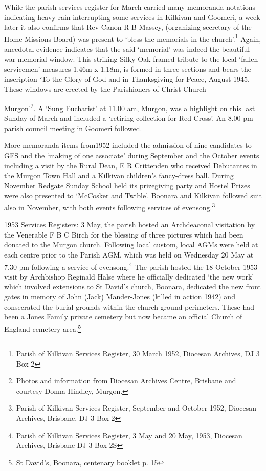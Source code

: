 While the parish services register for March carried many memoranda notations indicating heavy rain interrupting some services in Kilkivan and Goomeri, a week later it also confirms that Rev Canon R B Massey, (organizing secretary of the Home Missions Board) was present to `bless the memorials in the church'.\footnote{Parish of Kilkivan Services Register, 30 March 1952, Diocesan Archives, DJ 3 Box 2} Again, anecdotal evidence indicates that the said `memorial' was indeed the beautiful war memorial window. This striking Silky Oak framed tribute to the local `fallen servicemen' measures 1.46m x 1.18m, is formed in three sections and bears the inscription `To the Glory of God and in Thanksgiving for Peace, August 1945. These windows are erected by the Parishioners of Christ Church

Murgon'\footnote{Photos and information from Diocesan Archives Centre, Brisbane and courtesy Donna Hindley, Murgon.}. A `Sung Eucharist' at 11.00 am, Murgon, was a highlight on this last Sunday of March and included a `retiring collection for Red Cross'. An 8.00 pm parish council meeting in Goomeri followed.

More memoranda items from1952 included the admission of nine candidates to GFS and the `making of one associate' during September and the October events including a visit by the Rural Dean, E R Crittenden who received Debutantes in the Murgon Town Hall and a Kilkivan children's fancy-dress ball. During November Redgate Sunday School held its prizegiving party and Hostel Prizes were also presented to `McCosker and Twible'. Boonara and Kilkivan followed suit also in November, with both events following services of evensong.\footnote{Parish of Kilkivan Services Register, September and October 1952, Diocesan Archives, Brisbane, DJ 3 Box 2}

1953 Services Registers: 3 May, the parish hosted an Archdeaconal visitation by the Venerable F B C Birch for the blessing of three pictures which had been donated to the Murgon church. Following local custom, local AGMs were held at each centre prior to the Parish AGM, which was held on Wednesday 20 May at 7.30 pm following a service of evensong.\footnote{Parish of Kilkivan Services Register, 3 May and 20 May, 1953, Diocesan Archives, Brisbane DJ 3 Box 2S} The parish hosted the 18 October 1953 visit by Archbishop Reginald Halse where he officially dedicated `the new work' which involved extensions to St David's church, Boonara, dedicated the new front gates in memory of John (Jack) Mander-Jones (killed in action 1942) and consecrated the burial grounds within the church ground perimeters. These had been a Jones Family private cemetery but now became an official Church of England cemetery area.\footnote{St David's, Boonara, centenary booklet p. 15}

